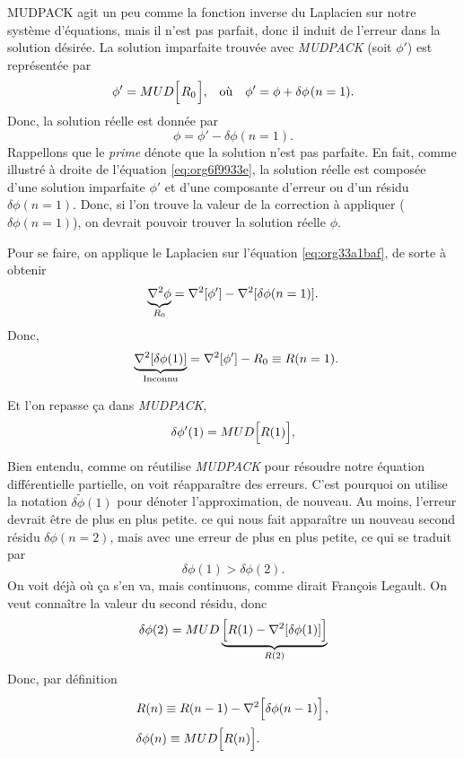 \documentclass[10pt]{article}
\numberwithin{equation}{section}
\newcommand{\tall}{\vphantom{pA^{x^x}_p}}
\newcommand{\grande}{\vphantom{\frac{1}{xx}}}
\newcommand{\pt}{\hspace{1pt}} %
\newcommand{\tphi}{\tilde{\phi}}
\begin{document}
MUDPACK agit un peu comme la fonction inverse du Laplacien sur notre système d'équations, mais il n'est pas parfait, donc il induit de l'erreur dans la solution désirée.
La solution imparfaite trouvée avec \emph{MUDPACK} (soit \(\phi'\)) est représentée par 
\begin{align}
\label{eq:org6f9933e}
   && \phi' = MUD\qty[\pt R_0\pt\tall ], && \text{où} && \phi' = \phi + \delta\phi\pt(n=1).&&
\end{align}
Donc, la solution réelle est donnée par
\begin{equation}
\label{eq:org33a1baf}
   \phi = \phi' - \delta\phi(n=1).
\end{equation}
Rappellons que le \emph{prime} dénote que la solution n'est pas parfaite. En fait, comme illustré à droite de l'équation \ref{eq:org6f9933e}, la solution réelle est composée d'une solution imparfaite \(\phi'\) et d'une composante d'erreur ou d'un résidu \(\delta \phi(n=1)\).
Donc, si l'on trouve la valeur de la correction à appliquer (\(\delta\phi(n=1)\)), on devrait pouvoir trouver la solution réelle \(\phi\).\bigskip

Pour se faire, on applique le Laplacien sur l'équation \ref{eq:org33a1baf}, de sorte à obtenir
\begin{equation}
   \underbrace{\laplacian{\phi}}_{R_0} = \laplacian[\phi'] - \laplacian[\delta\phi(n=1)].
\end{equation}
Donc,
\begin{equation}
   \hspace{2mm} \underbrace{\laplacian[\delta\phi(1)]}_\text{Inconnu} = \laplacian[\phi'] - R_0 \equiv R(n=1).
\end{equation}

Et l'on repasse ça dans \emph{MUDPACK},
\begin{equation}
   \delta\phi'(1) = MUD\qty[\tall R(1) ],
\end{equation}


Bien entendu, comme on réutilise \emph{MUDPACK} pour résoudre notre équation différentielle partielle, on voit réapparaître des erreurs.
C'est pourquoi on utilise la notation \(\delta \tphi(1)\) pour dénoter l'approximation, de nouveau.
Au moins, l'erreur devrait être de plus en plus petite.
ce qui nous fait apparaître un nouveau second résidu \(\delta\phi(n=2)\), mais avec une erreur de plus en plus petite, ce qui se traduit par
\begin{equation}
   \delta\phi(1) > \delta\phi(2).
\end{equation}
On voit déjà où ça s'en va, mais continuons, comme dirait François Legault.
On veut connaître la valeur du second résidu, donc
\begin{equation}
   \delta \phi(2) = MUD\underbrace{\qty[R(1)\tall - \laplacian[\delta\phi(1)]]}_{R(2)}
\end{equation}
Donc, par définition
\begin{align}
   & R(n) \equiv R(n-1) - \laplacian[\delta\phi(n-1)\tall]\pt,\grande\\
   & \delta\phi(n) \equiv MUD\qty[R(n)\tall].\grande
\end{align}
\end{document}
